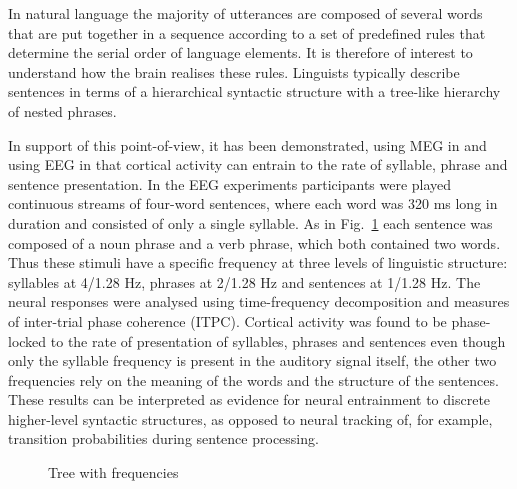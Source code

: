 \documentclass[10pt,letterpaper]{article}
\begin{document}
%
%

In natural language the majority of utterances are composed of several
words that are put together in a sequence according to a set of
predefined rules that determine the serial order of language
elements. It is therefore of interest to understand how the brain
realises these rules. Linguists typically describe sentences in terms
of a hierarchical syntactic structure with a tree-like hierarchy of
nested phrases.

In support of this point-of-view, it has been demonstrated, using MEG
in \cite{DingEtAl2016} and using EEG in \cite{DingEtAl2017} that
cortical activity can entrain to the rate of syllable, phrase and
sentence presentation. In the EEG experiments participants were played
continuous streams of four-word sentences, where each word was 320 ms
long in duration and consisted of only a single syllable. As in
Fig.~\ref{fig:freq_tree} each sentence was composed of a noun phrase
and a verb phrase, which both contained two words. Thus these stimuli
have a specific frequency at three levels of linguistic structure:
syllables at 4/1.28 Hz, phrases at 2/1.28 Hz and sentences at 1/1.28
Hz. The neural responses were analysed using time-frequency
decomposition and measures of inter-trial phase coherence
(ITPC). Cortical activity was found to be phase-locked to the rate of
presentation of syllables, phrases and sentences even though only the
syllable frequency is present in the auditory signal itself, the other two
frequencies rely on the meaning of the words and the structure of the
sentences.  These results can be interpreted as evidence for neural
entrainment to discrete higher-level syntactic structures, as opposed
to neural tracking of, for example, transition probabilities during
sentence processing.

\begin{figure}[tb]
\begin{center}
\end{center}
\caption{Tree with frequencies \label{fig:freq_tree}}
\end{figure}
\end{document}
